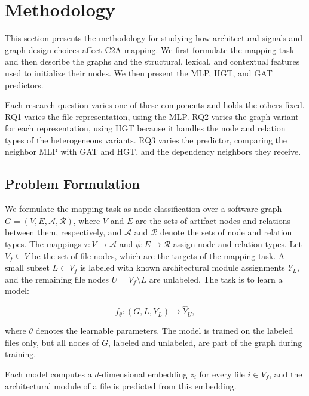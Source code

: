 \section{Methodology\label{sec:method}}

This section presents the methodology for studying how architectural signals and graph design choices affect C2A mapping. We first formulate the mapping task and then describe the graphs and the structural, lexical, and contextual features used to initialize their nodes. We then present the MLP, HGT, and GAT predictors.

Each research question varies one of these components and holds the others fixed. RQ1 varies the file representation, using the MLP. RQ2 varies the graph variant for each representation, using HGT because it handles the node and relation types of the heterogeneous variants. RQ3 varies the predictor, comparing the neighbor MLP with GAT and HGT, and the dependency neighbors they receive.

\subsection{Problem Formulation\label{sec:problem}}

We formulate the mapping task as node classification over a software graph $G=(V, E,\mathcal{A},\mathcal{R})$, where $V$ and $E$ are the sets of artifact nodes and relations between them, respectively, and $\mathcal{A}$ and $\mathcal{R}$ denote the sets of node and relation types. The mappings $\tau: V \rightarrow \mathcal{A}$ and $\phi: E \rightarrow \mathcal{R}$ assign node and relation types. Let $V_f \subseteq V$ be the set of file nodes, which are the targets of the mapping task. A small subset $L \subset V_f$ is labeled with known architectural module assignments $Y_L$, and the remaining file nodes $U = V_f \setminus L$ are unlabeled. The task is to learn a model:

\begin{equation}
    f_{\theta}: (G, L, Y_L) \rightarrow \hat{Y}_U,
\end{equation}

where $\theta$ denotes the learnable parameters. The model is trained on the labeled files only, but all nodes of $G$, labeled and unlabeled, are part of the graph during training.

Each model computes a $d$-dimensional embedding $z_i$ for every file $i \in V_f$, and the architectural module of a file is predicted from this embedding.

